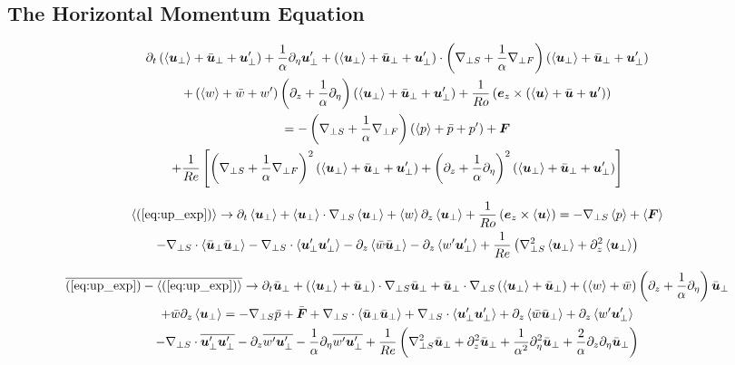 \documentclass{article}
\begin{document}
\subsection{The Horizontal Momentum Equation}

\begin{multline}
    \partial_t \upexp + \frac{1}{\alpha}\partial_{\eta} \uvec_{\perp}' +
    \upexp\cdot\left(\gradhs + \frac{1}{\alpha}\gradhf\right)\upexp 
    \\
    + \wexp\left(\partial_z + \frac{1}{\alpha}\partial_{\eta}\right)\upexp +
    \frac{1}{Ro}\left(\ez \times \uexp\right) 
    \\
    = -\left(\gradhs +
    \frac{1}{\alpha}\gradhf\right) \pexp + \F 
    \\
    +\frac{1}{Re}\left[\left(\gradhs +
    \frac{1}{\alpha}\gradhf\right)^2\upexp + \left(\partial_z +
    \frac{1}{\alpha}\partial_{\eta}\right)^2\upexp\right]\label{eq:up_exp}
\end{multline}

\begin{multline}
    \bracket{(\ref{eq:up_exp})} \to \partial_t \bracket{\uvecp} +
    \bracket{\uvec_{\perp}}\cdot\gradhs\bracket{\uvecp} 
     + \bracket{w}\partial_z\bracket{\uvecp} +
     \frac{1}{Ro}\left(\ez\times\bracket{\uvec}\right) = -\gradhs\bracket{p} +
     \bracket{\F}
     \\
     -\gradhs\cdot\bracket{\bar{\uvec}_{\perp} \bar{\uvec}_{\perp}} -
    \gradhs\cdot\bracket{\uvec'_{\perp} \uvec'_{\perp}} -
    \partial_z\bracket{\bar{w}\bar{\uvec}_{\perp}} -
    \partial_z\bracket{w'\uvec'_{\perp}}
    + \frac{1}{Re}\left(\gradhs^2\bracket{\uvecp} + \partial_z^2\bracket{\uvecp}\right)
    \label{eq:up_bracket_eq}
\end{multline}

\begin{multline}
    \overline{(\ref{eq:up_exp}) - \bracket{(\ref{eq:up_exp})}} \to \partial_t
    \baruvecp +
    \left(\bracket{\uvecp} + \bar{\uvec}_{\perp}\right)\cdot\gradhs \baruvecp +
    \baruvecp \cdot\gradhs\left(\brauvecp + \baruvecp\right) 
    + \left(\bracket{w} + \bar{w}\right)\left(\partial_z +
    \frac{1}{\alpha}\partial_{\eta}\right)\baruvecp 
    \\
    + \bar{w}\partial_z\brauvecp = - \gradhs
    \bar{p}  + \bar{\F} 
    + \gradhs\cdot\bracket{\bar{\uvec}_{\perp}\baruvecp}+ 
    \gradhs\cdot\bracket{\uvecp'\perpuvecp} +
    \partial_z\bracket{\bar{w}\baruvecp} +
    \partial_z\bracket{w'\perpuvecp} \\
    - \gradhs\cdot\overline{\uvecp'\perpuvecp} -
    \partial_z\overline{w'\perpuvecp} -
    \frac{1}{\alpha}\partial_{\eta}\overline{w'\perpuvecp} +
    \frac{1}{Re}\left(\gradhs^2\baruvecp + \partial_z^2\baruvecp +
    \frac{1}{\alpha^2}\partial_{\eta}^2\baruvecp +
    \frac{2}{\alpha}\partial_z\partial_{\eta}\baruvecp\right)\label{eq:up_bar_eq}
\end{multline}
\end{document}

